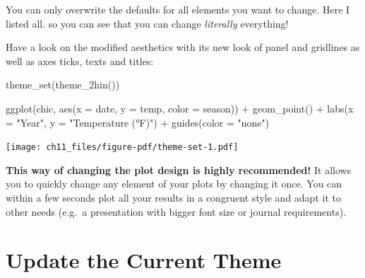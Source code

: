 \documentclass[
  letterpaper,
]{scrbook}
\newenvironment{Shaded}{\begin{snugshade}}{\end{snugshade}}
\newcommand{\AttributeTok}[1]{\textcolor[rgb]{0.40,0.45,0.13}{#1}}
\newcommand{\FunctionTok}[1]{\textcolor[rgb]{0.28,0.35,0.67}{#1}}
\newcommand{\NormalTok}[1]{\textcolor[rgb]{0.00,0.23,0.31}{#1}}
\newcommand{\SpecialCharTok}[1]{\textcolor[rgb]{0.37,0.37,0.37}{#1}}
\newcommand{\StringTok}[1]{\textcolor[rgb]{0.13,0.47,0.30}{#1}}
\begin{document}
\begin{tcolorbox}[enhanced jigsaw, toprule=.15mm, bottomtitle=1mm, coltitle=black, breakable, colbacktitle=quarto-callout-note-color!10!white, opacityback=0, toptitle=1mm, colframe=quarto-callout-note-color-frame, titlerule=0mm, title=\textcolor{quarto-callout-note-color}{\faInfo}\hspace{0.5em}{Note}, bottomrule=.15mm, arc=.35mm, opacitybacktitle=0.6, leftrule=.75mm, left=2mm, rightrule=.15mm, colback=white]

You can only overwrite the defaults for all elements you want to change.
Here I listed all. so you can see that you can change \emph{literally}
everything!

\end{tcolorbox}

Have a look on the modified aesthetics with its new look of panel and
gridlines as well as axes ticks, texts and titles:

\begin{Shaded}
\begin{Highlighting}[]
\FunctionTok{theme\_set}\NormalTok{(}\FunctionTok{theme\_2hin}\NormalTok{())}

\FunctionTok{ggplot}\NormalTok{(chic, }\FunctionTok{aes}\NormalTok{(}\AttributeTok{x =}\NormalTok{ date, }\AttributeTok{y =}\NormalTok{ temp, }\AttributeTok{color =}\NormalTok{ season)) }\SpecialCharTok{+}
  \FunctionTok{geom\_point}\NormalTok{() }\SpecialCharTok{+} \FunctionTok{labs}\NormalTok{(}\AttributeTok{x =} \StringTok{"Year"}\NormalTok{, }\AttributeTok{y =} \StringTok{"Temperature (°F)"}\NormalTok{) }\SpecialCharTok{+} \FunctionTok{guides}\NormalTok{(}\AttributeTok{color =} \StringTok{"none"}\NormalTok{)}
\end{Highlighting}
\end{Shaded}

\texttt{[image: ch11\_files/figure-pdf/theme-set-1.pdf]}

\textbf{This way of changing the plot design is highly recommended!} It
allows you to quickly change any element of your plots by changing it
once. You can within a few seconds plot all your results in a congruent
style and adapt it to other needs (e.g.~a presentation with bigger font
size or journal requirements).

\section{Update the Current Theme}\label{update-the-current-theme}
\end{document}
